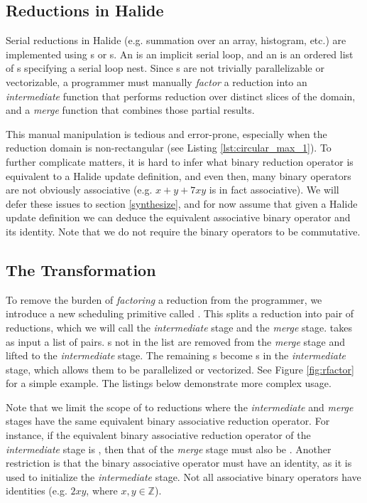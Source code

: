 \subsection{Reductions in Halide}

Serial reductions in Halide (e.g. summation over an array, histogram, etc.) are implemented using s or s. An  is an implicit serial loop, and an  is an ordered list of s specifying a serial loop nest. Since s are not trivially parallelizable or vectorizable, a programmer must manually \emph{factor} a reduction into an \emph{intermediate} function that performs reduction over distinct slices of the domain, and a \emph{merge} function that combines those partial results.

This manual manipulation is tedious and error-prone, especially when the reduction domain is non-rectangular (see Listing \ref{lst:circular_max_1}). To further complicate matters, it is hard to infer what binary reduction operator is equivalent to a Halide update definition, and even then, many binary operators are not obviously associative (e.g. $x + y + 7xy$ is in fact associative). We will defer these issues to section \ref{synthesize}, and for now assume that given a Halide update definition we can deduce the equivalent associative binary operator and its identity. Note that we do not require the binary operators to be commutative.

\subsection{The  Transformation}

To remove the burden of \emph{factoring} a reduction from the programmer, we introduce a new scheduling primitive called . This splits a reduction into pair of reductions, which we will call the \emph{intermediate} stage and the \emph{merge} stage.  takes as input a list of  pairs. s not in the list are removed from the \emph{merge} stage and lifted to the \emph{intermediate} stage. The remaining s become s in the \emph{intermediate} stage, which allows them to be parallelized or vectorized. See Figure \ref{fig:rfactor} for a simple example. The listings below demonstrate more complex usage.

 Note that we limit the scope of  to reductions where the \emph{intermediate} and \emph{merge} stages have the same equivalent binary associative reduction operator. For instance, if the equivalent binary associative reduction operator of the \emph{intermediate} stage is , then that of the \emph{merge} stage must also be . Another restriction is that the binary associative operator must have an identity, as it is used to initialize the \emph{intermediate} stage. Not all associative binary operators have identities (e.g. $2xy$, where $x, y \in \mathds{Z}$).

